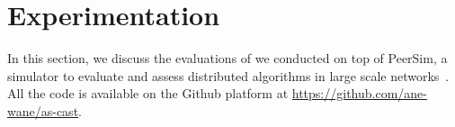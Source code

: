 \newcommand{\FIGSCALE}{0.48}

\section{Experimentation}
\label{sec:experimentation}

In this section, we discuss the evaluations of \NAME we conducted on top of
PeerSim, a simulator to
evaluate and assess distributed algorithms in large scale
networks~\cite{montresor2009peersim}. All the code is available on the
Github platform at \mbox{\url{https://github.com/ane-wane/as-cast}}.


